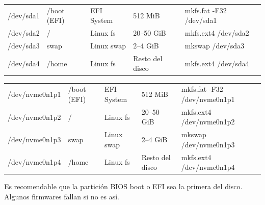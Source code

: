 \begin{tcolorbox}[title=Esquema GPT con EFI (UEFI) — SATA]
\begin{ttfamily}
  \begin{tabular}{lllll}
    {\color{blue}/dev/sda1} & {\color{red}/boot (EFI)} & {\color{brown}EFI System} & 512 MiB          & {\color{orange}mkfs.fat -F32 /dev/sda1} \\
    {\color{blue}/dev/sda2} & {\color{red}/}           & {\color{brown}Linux fs}   & 20--50 GiB       & {\color{orange}mkfs.ext4 /dev/sda2} \\
    {\color{blue}/dev/sda3} & {\color{red}swap}        & {\color{brown}Linux swap} & 2--4 GiB         & {\color{orange}mkswap /dev/sda3} \\
    {\color{blue}/dev/sda4} & {\color{red}/home}       & {\color{brown}Linux fs}   & Resto del disco  & {\color{orange}mkfs.ext4 /dev/sda4} \\
  \end{tabular}
\end{ttfamily}
\end{tcolorbox}

\begin{tcolorbox}[title=Esquema GPT con EFI (UEFI) — NVMe]
\begin{ttfamily}
  \begin{tabular}{lllll}
    {\color{blue}/dev/nvme0n1p1} & {\color{red}/boot (EFI)} & {\color{brown}EFI System} & 512 MiB          & {\color{orange}mkfs.fat -F32 /dev/nvme0n1p1} \\
    {\color{blue}/dev/nvme0n1p2} & {\color{red}/}           & {\color{brown}Linux fs}   & 20--50 GiB       & {\color{orange}mkfs.ext4 /dev/nvme0n1p2} \\
    {\color{blue}/dev/nvme0n1p3} & {\color{red}swap}        & {\color{brown}Linux swap} & 2--4 GiB         & {\color{orange}mkswap /dev/nvme0n1p3} \\
    {\color{blue}/dev/nvme0n1p4} & {\color{red}/home}       & {\color{brown}Linux fs}   & Resto del disco  & {\color{orange}mkfs.ext4 /dev/nvme0n1p4} \\
  \end{tabular}
\end{ttfamily}
\end{tcolorbox}

\begin{tcolorbox}[colframe=red!75!black, title=\twemoji{warning} A tener en cuenta]
Es recomendable que la partición BIOS boot o EFI sea la primera del disco.
Algunos firmwares fallan si no es así.
\end{tcolorbox}

